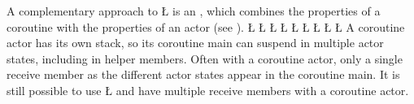\documentclass[openright,twoside]{report}
\begin{document}
A complementary approach to \LGinlinetrue\LGbegin\lgrinde\L{}\endlgrinde\LGend{} is an , which combines the properties of a coroutine with the properties of an actor (see ).
\LGinlinefalse\LGbegin\lgrinde
\L{}
\L{\LB{}}
\CE{}\L{\LB{}}
\L{\LB{}}
\L{\LB{}}
\L{\LB{}}
\CE{}\L{\LB{}}
\CE{}\L{\LB{}}
\L{\LB{\};}}
\endlgrinde\LGend
A coroutine actor has its own stack, so its coroutine main can suspend in multiple actor states, including in helper members.
Often with a coroutine actor, only a single receive member as the different actor states appear in the coroutine main.
It is still possible to use \LGinlinetrue\LGbegin\lgrinde\L{}\endlgrinde\LGend{} and have multiple receive members with a coroutine actor.
\end{document}
